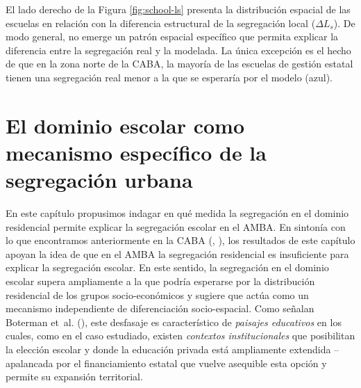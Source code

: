 \documentclass[
  spanish,
  a4paper,%
  chapterprefix=true,%
  DIV=calc,%
  twoside]{scrbook}%
\begin{document}
El lado derecho de la Figura \ref{fig:school-ls} presenta la
distribución espacial de las escuelas en relación con la diferencia
estructural de la segregación local (\(\Delta L_s\)). De modo general, no
emerge un patrón espacial específico que permita explicar la diferencia
entre la segregación real y la modelada. La única excepción es el hecho
de que en la zona norte de la CABA, la mayoría de las escuelas de
gestión estatal tienen una segregación real menor a la que se esperaría
por el modelo (azul).

\section{El dominio escolar como mecanismo específico de la segregación urbana}\label{school-conclussion}

En este capítulo propusimos indagar en qué medida la segregación en el
dominio residencial permite explicar la segregación escolar en el AMBA.
En sintonía con lo que encontramos anteriormente en la CABA
(, ), los resultados de este capítulo apoyan la
idea de que en el AMBA la segregación residencial es insuficiente para
explicar la segregación escolar. En este sentido, la segregación en el
dominio escolar supera ampliamente a la que podría esperarse por la
distribución residencial de los grupos socio-económicos y sugiere que
actúa como un mecanismo independiente de diferenciación socio-espacial.
Como señalan Boterman et~al. (), este desfasaje es característico de
\emph{paisajes educativos} en los cuales, como en el caso estudiado, existen
\emph{contextos institucionales} que posibilitan la elección escolar y donde
la educación privada está ampliamente extendida --apalancada por el
financiamiento estatal que vuelve asequible esta opción y permite su
expansión territorial.
\end{document}
